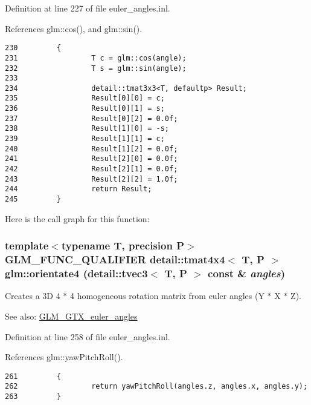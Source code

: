 Definition at line 227 of file euler\_\-angles.inl.

References glm::cos(), and glm::sin().

\begin{Code}\begin{verbatim}230         {
231                 T c = glm::cos(angle);
232                 T s = glm::sin(angle);
233 
234                 detail::tmat3x3<T, defaultp> Result;
235                 Result[0][0] = c;
236                 Result[0][1] = s;
237                 Result[0][2] = 0.0f;
238                 Result[1][0] = -s;
239                 Result[1][1] = c;
240                 Result[1][2] = 0.0f;
241                 Result[2][0] = 0.0f;
242                 Result[2][1] = 0.0f;
243                 Result[2][2] = 1.0f;
244                 return Result;
245         }
\end{verbatim}
\end{Code}




Here is the call graph for this function:\hypertarget{group__gtx__euler__angles_g98f6c8d3b6b97ff0ae2f64544142cb7f}{
\subsubsection[orientate4]{\setlength{\rightskip}{0pt plus 5cm}template$<$typename T, precision P$>$ GLM\_\-FUNC\_\-QUALIFIER detail::tmat4x4$<$ T, P $>$ glm::orientate4 (detail::tvec3$<$ T, P $>$ const \& {\em angles})}}
\label{group__gtx__euler__angles_g98f6c8d3b6b97ff0ae2f64544142cb7f}


Creates a 3D 4 $\ast$ 4 homogeneous rotation matrix from euler angles (Y $\ast$ X $\ast$ Z). \begin{Desc}
\item[See also:]\hyperlink{group__gtx__euler__angles}{GLM\_\-GTX\_\-euler\_\-angles} \end{Desc}


Definition at line 258 of file euler\_\-angles.inl.

References glm::yawPitchRoll().

\begin{Code}\begin{verbatim}261         {
262                 return yawPitchRoll(angles.z, angles.x, angles.y);
263         }
\end{verbatim}
\end{Code}




